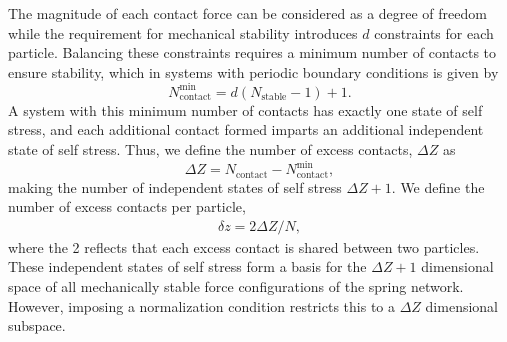 The magnitude of each contact force can be considered as a degree of freedom while the requirement for mechanical stability introduces $d$ constraints for each particle.  Balancing these constraints requires a minimum number of contacts to ensure stability, which in systems with periodic boundary conditions is given by~\cite{dagois-bohy_soft-sphere_2012, goodrich_finite-size_2012}
 \begin{equation}
     N^\textrm{min}_\textrm{contact} = d(N_\textrm{stable}-1)+1.
 \end{equation} 
A system with this minimum number of contacts has exactly one state of self stress, and each additional contact formed imparts an additional independent state of self stress. Thus, we define the number of excess contacts, $\Delta Z$ as
\begin{equation}
    \Delta Z=N_\textrm{contact}-N^\textrm{min}_\textrm{contact},
\end{equation}
 making the number of independent states of self stress $\Delta Z+1$. We define the number of excess contacts per particle,
 \begin{align}
 \delta z = 2\Delta Z / N,
 \end{align}
where the 2 reflects that each excess contact is shared between two particles. These independent states of self stress form a basis for the $\Delta Z+1$ dimensional space of all mechanically stable force configurations of the spring network. However, imposing a normalization condition restricts this to a $\Delta Z$ dimensional subspace.

